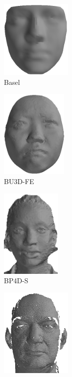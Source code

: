 \begin{figure}[t]
	\centering
	\begin{subfigure}[b]{0.18\textwidth}
		\centering
		\includegraphics[height=1.5in]{background/images/basel}
		\caption{Basel}\label{fig:db_examples_basel}
	\end{subfigure}
	\begin{subfigure}[b]{0.18\textwidth}
		\centering
		\includegraphics[height=1.7in]{background/images/bu3d}
		\caption{BU3D-FE}\label{fig:db_examples_bu3d}
	\end{subfigure}
	\begin{subfigure}[b]{0.18\textwidth}
		\centering
		\includegraphics[height=1.7in]{background/images/bp4d}
		\caption{BP4D-S}\label{fig:db_examples_bp4d}
	\end{subfigure}
	\begin{subfigure}[b]{0.18\textwidth}
		\centering
		\includegraphics[height=1.7in]{background/images/frgc}

\end{subfigure}
\end{figure}
